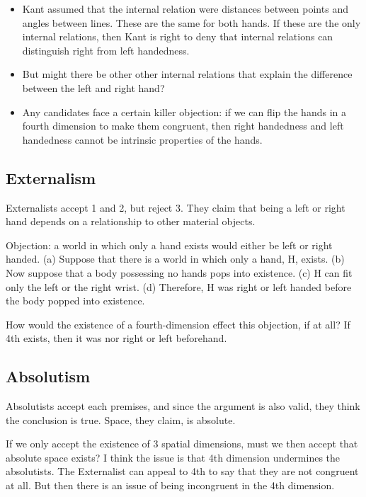 \documentclass[]{article}
\begin{document}
\begin{itemize}
\item
  Kant assumed that the internal relation were distances between points
  and angles between lines. These are the same for both hands. If these
  are the only internal relations, then Kant is right to deny that
  internal relations can distinguish right from left handedness.
\item
  But might there be other other internal relations that explain the
  difference between the left and right hand?
\item
  Any candidates face a certain killer objection: if we can flip the
  hands in a fourth dimension to make them congruent, then right
  handedness and left handedness cannot be intrinsic properties of the
  hands.
\end{itemize}

\subsection{Externalism}\label{externalism}

Externalists accept 1 and 2, but reject 3. They claim that being a left
or right hand depends on a relationship to other material objects.

Objection: a world in which only a hand exists would either be left or
right handed. (a) Suppose that there is a world in which only a hand, H,
exists. (b) Now suppose that a body possessing no hands pops into
existence. (c) H can fit only the left or the right wrist. (d)
Therefore, H was right or left handed before the body popped into
existence.

How would the existence of a fourth-dimension effect this objection, if
at all? If 4th exists, then it was nor right or left beforehand.

\subsection{Absolutism}\label{absolutism}

Absolutists accept each premises, and since the argument is also valid,
they think the conclusion is true. Space, they claim, is absolute.

If we only accept the existence of 3 spatial dimensions, must we then
accept that absolute space exists? I think the issue is that 4th
dimension undermines the absolutists. The Externalist can appeal to 4th
to say that they are not congruent at all. But then there is an issue of
being incongruent in the 4th dimension.
\end{document}
